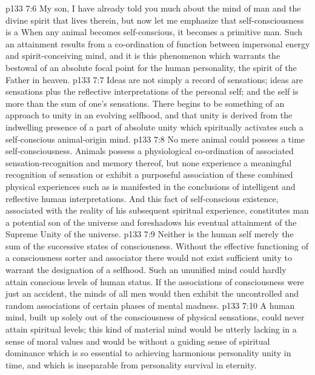 \pc \vs p133 7:6 \textcolor{ubdarkred}{My son, I have already told you much about the mind of man and the divine spirit that lives therein, but now let me emphasize that self\hyp{}consciousness is a  When any animal becomes self\hyp{}conscious, it becomes a primitive man. Such an attainment results from a co\hyp{}ordination of function between impersonal energy and spirit\hyp{}conceiving mind, and it is this phenomenon which warrants the bestowal of an absolute focal point for the human personality, the spirit of the Father in heaven.}
\vs p133 7:7 \textcolor{ubdarkred}{Ideas are not simply a record of sensations; ideas are sensations plus the reflective interpretations of the personal self; and the self is more than the sum of one’s sensations. There begins to be something of an approach to unity in an evolving selfhood, and that unity is derived from the indwelling presence of a part of absolute unity which spiritually activates such a self\hyp{}conscious animal\hyp{}origin mind.}
\vs p133 7:8 \textcolor{ubdarkred}{No mere animal could possess a time self\hyp{}consciousness. Animals possess a physiological co\hyp{}ordination of associated sensation\hyp{}recognition and memory thereof, but none experience a meaningful recognition of sensation or exhibit a purposeful association of these combined physical experiences such as is manifested in the conclusions of intelligent and reflective human interpretations. And this fact of self\hyp{}conscious existence, associated with the reality of his subsequent spiritual experience, constitutes man a potential son of the universe and foreshadows his eventual attainment of the Supreme Unity of the universe.}\plusone
\vs p133 7:9 Neither is the human self merely the sum of the successive states of consciousness. Without the effective functioning of a consciousness sorter and associator there would not exist sufficient unity to warrant the designation of a selfhood. Such an ununified mind could hardly attain conscious levels of human status. If the associations of consciousness were just an accident, the minds of all men would then exhibit the uncontrolled and random associations of certain phases of mental madness.\plusone
\vs p133 7:10 \textcolor{ubdarkred}{A human mind, built up solely out of the consciousness of physical sensations, could never attain spiritual levels; this kind of material mind would be utterly lacking in a sense of moral values and would be without a guiding sense of spiritual dominance which is so essential to achieving harmonious personality unity in time, and which is inseparable from personality survival in eternity.}
